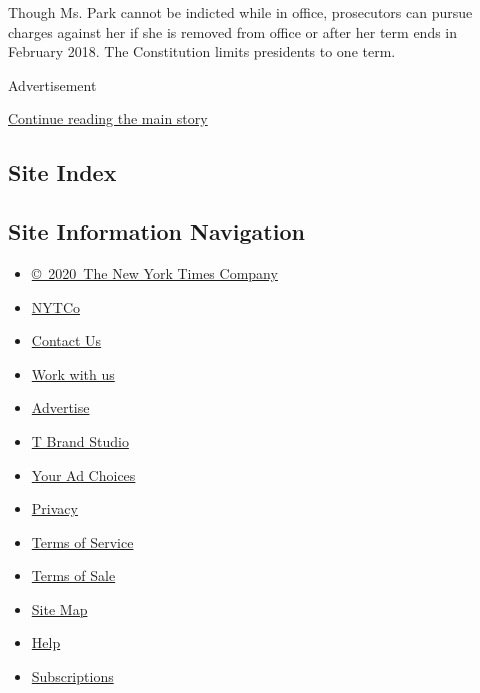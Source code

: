 Though Ms. Park cannot be indicted while in office, prosecutors can
pursue charges against her if she is removed from office or after her
term ends in February 2018. The Constitution limits presidents to one
term.

Advertisement

\protect\hyperlink{after-bottom}{Continue reading the main story}

\hypertarget{site-index}{%
\subsection{Site Index}\label{site-index}}

\hypertarget{site-information-navigation}{%
\subsection{Site Information
Navigation}\label{site-information-navigation}}

\begin{itemize}
\tightlist
\item
  \href{https://help.nytimes.com/hc/en-us/articles/115014792127-Copyright-notice}{©~2020~The
  New York Times Company}
\end{itemize}

\begin{itemize}
\tightlist
\item
  \href{https://www.nytco.com/}{NYTCo}
\item
  \href{https://help.nytimes.com/hc/en-us/articles/115015385887-Contact-Us}{Contact
  Us}
\item
  \href{https://www.nytco.com/careers/}{Work with us}
\item
  \href{https://nytmediakit.com/}{Advertise}
\item
  \href{http://www.tbrandstudio.com/}{T Brand Studio}
\item
  \href{https://www.nytimes.com/privacy/cookie-policy\#how-do-i-manage-trackers}{Your
  Ad Choices}
\item
  \href{https://www.nytimes.com/privacy}{Privacy}
\item
  \href{https://help.nytimes.com/hc/en-us/articles/115014893428-Terms-of-service}{Terms
  of Service}
\item
  \href{https://help.nytimes.com/hc/en-us/articles/115014893968-Terms-of-sale}{Terms
  of Sale}
\item
  \href{https://spiderbites.nytimes.com}{Site Map}
\item
  \href{https://help.nytimes.com/hc/en-us}{Help}
\item
  \href{https://www.nytimes.com/subscription?campaignId=37WXW}{Subscriptions}
\end{itemize}

